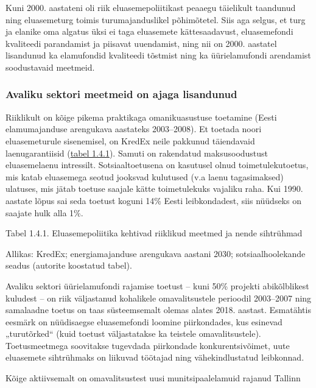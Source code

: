 \documentclass[estonian,]{article}
\begin{document}
Kuni 2000. aastateni oli riik eluasemepoliitikast peaaegu täielikult taandunud ning eluasemeturg toimis turumajanduslikel põhimõtetel. Siis aga selgus, et turg ja elanike oma algatus üksi ei taga eluasemete kättesaadavust, eluasemefondi kvaliteedi parandamist ja piisavat uuendamist, ning nii on 2000. aastatel lisandunud ka elamufondid kvaliteedi tõstmist ning ka üürielamufondi arendamist soodustavaid meetmeid.

\hypertarget{avaliku-sektori-meetmeid-on-ajaga-lisandunud}{%
\subsubsection*{Avaliku sektori meetmeid on ajaga lisandunud}\label{avaliku-sektori-meetmeid-on-ajaga-lisandunud}}

Riiklikult on kõige pikema praktikaga omanikuasustuse toetamine (Eesti elamumajanduse arengukava aastateks 2003--2008). Et toetada noori eluasemeturule sisenemisel, on KredEx neile pakkunud täiendavaid laenugarantiisid (\protect\hyperlink{table141}{tabel 1.4.1}). Samuti on rakendatud maksusoodustust eluasemelaenu intressilt. Sotsiaaltoetusena on kasutusel olnud toimetulekutoetus, mis katab eluasemega seotud jooksvad kulutused (v.a laenu tagasimaksed) ulatuses, mis jätab toetuse saajale kätte toimetulekuks vajaliku raha. Kui 1990. aastate lõpus sai seda toetust koguni 14\% Eesti leibkondadest, siis nüüdseks on saajate hulk alla 1\%.

{Tabel 1.4.1.} Eluasemepoliitika kehtivad riiklikud meetmed ja nende sihtrühmad

\begin{imgsource}
{Allikas:} KredEx; energiamajanduse arengukava aastani 2030;
sotsiaalhoolekande seadus (autorite koostatud tabel).
\end{imgsource}

Avaliku sektori üürielamufondi rajamise toetust -- kuni 50\% projekti abikõlblikest kuludest -- on riik väljastanud kohalikele omavalitsustele perioodil 2003--2007 ning samalaadne toetus on taas süsteemsemalt olemas alates 2018. aastast. Esmatähtis eesmärk on nüüdisaegse eluasemefondi loomine piirkondades, kus esinevad „turutõrked`` (kuid toetust väljastatakse ka teistele omavalitsustele). Toetusmeetmega soovitakse tugevdada piirkondade konkurentsivõimet, uute eluasemete sihtrühmaks on liikuvad töötajad ning vähekindlustatud leibkonnad.

Kõige aktiivsemalt on omavalitsustest uusi munitsipaalelamuid rajanud Tallinn
\end{document}
